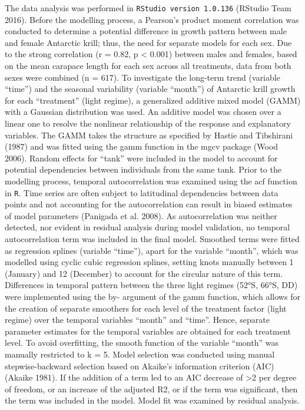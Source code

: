 The data analysis was performed in \texttt{RStudio version 1.0.136} (RStudio Team 2016). Before the modelling process, a Pearson’s product moment correlation was conducted to determine a potential difference in growth pattern between male and female Antarctic krill; thus, the need for separate models for each sex. Due to the strong correlation (r = 0.82, p < 0.001) between males and females, based on the mean carapace length for each sex across all treatments, data from both sexes were combined (n = 617). To investigate the long-term trend (variable “time”) and the seasonal variability (variable “month”) of Antarctic krill growth for each “treatment” (light regime), a generalized additive mixed model (GAMM) with a Gaussian distribution was used. An additive model was chosen over a linear one to resolve the nonlinear relationship of the response and explanatory variables. The GAMM takes the structure as specified by Hastie and Tibshirani (1987) and was fitted using the gamm function in the mgcv package (Wood 2006). Random effects for “tank” were included in the model to account for potential dependencies between individuals from the same tank. Prior to the modelling process, temporal autocorrelation was examined using the acf function in \texttt{R}. Time series are often subject to latitudinal dependencies between data points and not accounting for the autocorrelation can result in biased estimates of model parameters (Panigada et al. 2008). As autocorrelation was neither detected, nor evident in residual analysis during model validation, no temporal autocorrelation term was included in the final model. 
Smoothed terms were fitted as regression splines (variable “time”), apart for the variable “month”, which was modelled using cyclic cubic regression splines, setting knots manually between 1 (January) and 12 (December) to account for the circular nature of this term. Differences in temporal pattern between the three light regimes (52°S, 66°S, DD) were implemented using the by- argument of the gamm function, which allows for the creation of separate smoothers for each level of the treatment factor (light regime) over the temporal variables “month” and “time”. Hence, separate parameter estimates for the temporal variables are obtained for each treatment level. To avoid overfitting, the smooth function of the variable “month” was manually restricted to k = 5. Model selection was conducted using manual stepwise-backward selection based on Akaike’s information criterion (AIC) (Akaike 1981). If the addition of a term led to an AIC decrease of >2 per degree of freedom, or an increase of the adjusted R2, or if the term was significant, then the term was included in the model. Model fit was examined by residual analysis.

